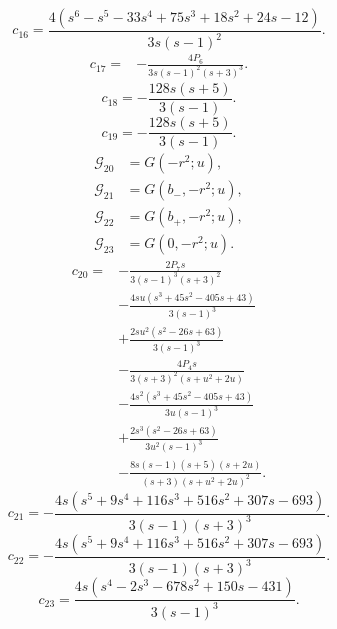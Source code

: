 \begin{equation}
c_{16}=\frac{4 \left(s^{6} - s^{5} - 33 s^{4} + 75 s^{3} + 18 s^{2} + 24 s - 12\right)}{3 s \left(s - 1\right)^{2}}.
\end{equation}
\begin{align}
c_{17}={}&- \frac{4 P_{6}}{3 s \left(s - 1\right)^{2} \left(s + 3\right)^{3}}.
\end{align}
\begin{equation}
c_{18}=- \frac{128 s \left(s + 5\right)}{3 \left(s - 1\right)}.
\end{equation}
\begin{equation}
c_{19}=- \frac{128 s \left(s + 5\right)}{3 \left(s - 1\right)}.
\end{equation}
\begin{align}
\mathcal G_{20}&=G(- r^{2};u),\\
\mathcal G_{21}&=G(b_{-},- r^{2};u),\\
\mathcal G_{22}&=G(b_{+},- r^{2};u),\\
\mathcal G_{23}&=G(0,- r^{2};u).
\end{align}
\begin{align}
c_{20}={}&- \frac{2 P_{7} s}{3 \left(s - 1\right)^{3} \left(s + 3\right)^{2}}\\
&- \frac{4 s u \left(s^{3} + 45 s^{2} - 405 s + 43\right)}{3 \left(s - 1\right)^{3}}\\
&+\frac{2 s u^{2} \left(s^{2} - 26 s + 63\right)}{3 \left(s - 1\right)^{3}}\\
&- \frac{4 P_{4} s}{3 \left(s + 3\right)^{2} \left(s + u^{2} + 2 u\right)}\\
&- \frac{4 s^{2} \left(s^{3} + 45 s^{2} - 405 s + 43\right)}{3 u \left(s - 1\right)^{3}}\\
&+\frac{2 s^{3} \left(s^{2} - 26 s + 63\right)}{3 u^{2} \left(s - 1\right)^{3}}\\
&- \frac{8 s \left(s - 1\right) \left(s + 5\right) \left(s + 2 u\right)}{\left(s + 3\right) \left(s + u^{2} + 2 u\right)^{2}}.
\end{align}
\begin{equation}
c_{21}=- \frac{4 s \left(s^{5} + 9 s^{4} + 116 s^{3} + 516 s^{2} + 307 s - 693\right)}{3 \left(s - 1\right) \left(s + 3\right)^{3}}.
\end{equation}
\begin{equation}
c_{22}=- \frac{4 s \left(s^{5} + 9 s^{4} + 116 s^{3} + 516 s^{2} + 307 s - 693\right)}{3 \left(s - 1\right) \left(s + 3\right)^{3}}.
\end{equation}
\begin{equation}
c_{23}=\frac{4 s \left(s^{4} - 2 s^{3} - 678 s^{2} + 150 s - 431\right)}{3 \left(s - 1\right)^{3}}.
\end{equation}
